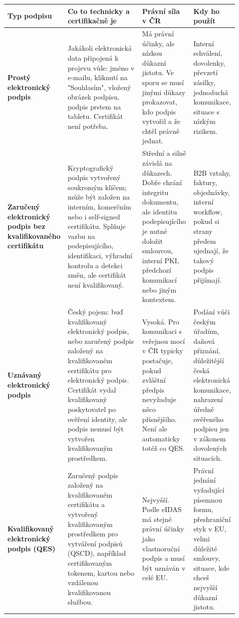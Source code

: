 \begin{longtable}{p{0.19\linewidth}p{0.32\linewidth}p{0.22\linewidth}p{0.19\linewidth}}
\toprule
\textbf{Typ podpisu} & \textbf{Co to technicky a certifikačně je} & \textbf{Právní síla v ČR} & \textbf{Kdy ho použít}\\
\midrule
\textbf{Prostý elektronický podpis} & Jakákoli elektronická data připojená k projevu vůle: jméno v e-mailu, kliknutí na "Souhlasím", vložený obrázek podpisu, podpis prstem na tabletu. Certifikát není potřeba. & Má právní účinky, ale nízkou důkazní jistotu. Ve sporu se musí jinými důkazy prokazovat, kdo podpis vytvořil a že chtěl právně jednat. & Interní schválení, dovolenky, převzetí zásilky, jednoduchá komunikace, situace s nízkým rizikem.\\
\addlinespace
\textbf{Zaručený elektronický podpis bez kvalifikovaného certifikátu} & Kryptografický podpis vytvořený soukromým klíčem; může být založen na interním, komerčním nebo i self-signed certifikátu. Splňuje vazbu na podepisujícího, identifikaci, výhradní kontrolu a detekci změn, ale certifikát není kvalifikovaný. & Střední a silně závislá na důkazech. Dobře chrání integritu dokumentu, ale identitu podepisujícího je nutné doložit smlouvou, interní PKI, předchozí komunikací nebo jiným kontextem. & B2B vztahy, faktury, objednávky, interní workflow, pokud si strany předem ujednají, že takový podpis přijímají.\\
\addlinespace
\textbf{Uznávaný elektronický podpis} & Český pojem: buď kvalifikovaný elektronický podpis, nebo zaručený podpis založený na kvalifikovaném certifikátu pro elektronický podpis. Certifikát vydal kvalifikovaný poskytovatel po ověření identity, ale podpis nemusí být vytvořen kvalifikovaným prostředkem. & Vysoká. Pro komunikaci s veřejnou mocí v ČR typicky postačuje, pokud zvláštní předpis nevyžaduje něco přísnějšího. Není ale automaticky totéž co QES. & Podání vůči českým úřadům, daňová přiznání, důležitější česká elektronická komunikace, nahrazení úředně ověřeného podpisu jen v zákonem dovolených situacích.\\
\addlinespace
\textbf{Kvalifikovaný elektronický podpis (QES)} & Zaručený podpis založený na kvalifikovaném certifikátu a vytvořený kvalifikovaným prostředkem pro vytváření podpisů (QSCD), například certifikovaným tokenem, kartou nebo vzdálenou kvalifikovanou službou. & Nejvyšší. Podle eIDAS má stejné právní účinky jako vlastnoruční podpis a musí být uznáván v celé EU. & Právní jednání vyžadující písemnou formu, přeshraniční styk v EU, velmi důležité smlouvy, situace, kde chceš nejvyšší důkazní jistotu.\\
\bottomrule
\end{longtable}

